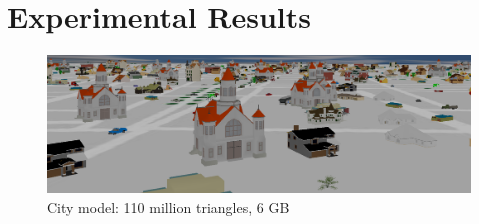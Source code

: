 
\section{Experimental Results}

\begin{figure}[t]
  \centering
  \includegraphics[width=\columnwidth]{city.png}
  \caption{City model: 110 million triangles, 6 GB }
  \label{fig:model1}
\end{figure}



